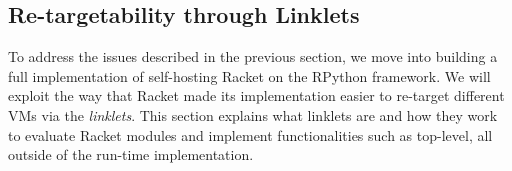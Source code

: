 \subsection{Re-targetability through Linklets}
\label{subsec:linklets}

To address the issues described in the previous section, we move into
building a full implementation of self-hosting Racket on the RPython
framework. We will exploit the way that Racket made its implementation
easier to re-target different VMs via the \emph{linklets}. This
section explains what linklets are and how they work to evaluate
Racket modules and implement functionalities such as top-level, all
outside of the run-time implementation.




